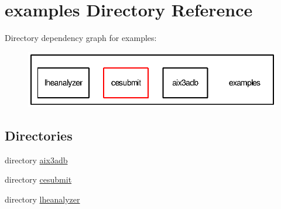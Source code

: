 \section{examples Directory Reference}
\label{dir_d28a4824dc47e487b107a5db32ef43c4}
Directory dependency graph for examples\-:
\nopagebreak
\begin{figure}[H]
\begin{center}
\leavevmode
\includegraphics[width=350pt]{dir_d28a4824dc47e487b107a5db32ef43c4_dep}
\end{center}
\end{figure}
\subsection*{Directories}
\begin{DoxyCompactItemize}
\item 
directory \hyperlink{dir_0d9b7320eca28c6cc809bcd86084f576}{aix3adb}
\item 
directory \hyperlink{dir_bb7348b63b2005d0b0d15b0f3d93662e}{cesubmit}
\item 
directory \hyperlink{dir_b7ff8447ec2398feea96196955119396}{lheanalyzer}
\end{DoxyCompactItemize}
